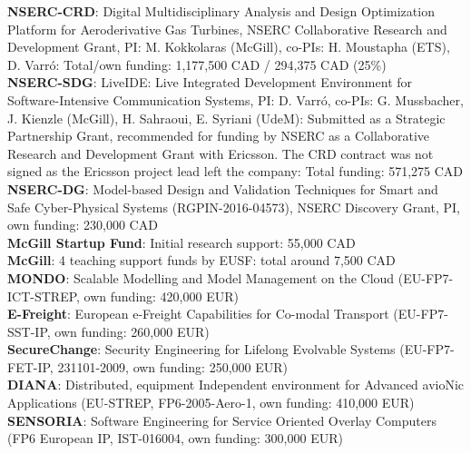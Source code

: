 \documentclass{xetexCV}
\begin{document}
\textbf{NSERC-CRD}:  Digital Multidisciplinary Analysis and Design Optimization Platform for Aeroderivative Gas Turbines, NSERC Collaborative Research and Development Grant, PI: M. Kokkolaras (McGill), co-PIs: H. Moustapha (ETS), 
D. Varr\'o:  Total/own funding: 1,177,500 CAD / 294,375 CAD (25\%)\\
\textbf{NSERC-SDG}:  LiveIDE: Live Integrated Development Environment for Software-Intensive Communication Systems, PI: D. Varr\'o, co-PIs: G. Mussbacher, J. Kienzle (McGill), H. Sahraoui, E. Syriani (UdeM): Submitted as a Strategic Partnership Grant, recommended for funding by NSERC as a Collaborative Research and Development Grant with Ericsson. The CRD contract was not signed as the Ericsson project lead left the company: Total funding: 571,275 CAD\\
\textbf{NSERC-DG}:  Model-based Design and Validation Techniques for
Smart and Safe Cyber-Physical Systems (RGPIN-2016-04573), NSERC Discovery Grant, PI, own funding: 230,000 CAD \\
\textbf{McGill Startup Fund}:  Initial research support: 55,000 CAD \\
\textbf{McGill}:  4 teaching support funds by EUSF: total around 7,500 CAD \\

\textbf{MONDO}:  Scalable Modelling and Model Management 
on the Cloud (EU-FP7-ICT-STREP, own funding: 420,000 EUR)  \\
\textbf{E-Freight}: European e-Freight Capabilities for
Co-modal Transport (EU-FP7-SST-IP, own funding: 260,000 EUR)  \\
\textbf{SecureChange}: Security Engineering for Lifelong
Evolvable Systems (EU-FP7-FET-IP, 231101-2009, own funding: 250,000 EUR)  \\ 
\textbf{DIANA}: Distributed, equipment Independent
environment for Advanced avioNic Applications (EU-STREP, FP6-2005-Aero-1, own funding: 410,000 EUR) \\
\textbf{SENSORIA}: Software Engineering for Service Oriented
Overlay Computers (FP6 European IP, IST-016004, own funding: 300,000 EUR)  

\end{document}
